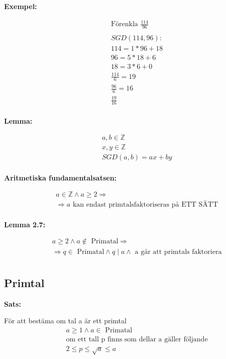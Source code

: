 \newpage
\textbf{Exempel:}\par
\begin{align*}
  &\quad \text{Förenkla } \frac{114}{96} \\
  &\quad \\
  &\quad SGD(114,96):    \\
  &\quad 114 = 1*96 + 18 \\
  &\quad 96  = 5*18 + 6  \\
  &\quad 18  = 3*6  + 0  \\
  &\quad \frac{114}{6} = 19 \\
  &\quad \frac{96}{6}  = 16 \\
  &\quad \frac{19}{16} \\
\end{align*}


\textbf{Lemma:}\par
\begin{align*}
  &\quad  a, b \in \mathbb{Z} \\
  &\quad  x, y \in \mathbb{Z} \\
  &\quad  SGD(a,b) = ax + by  \\
\end{align*}


\textbf{Aritmetiska fundamentalsatsen:}\par
\begin{align*}
  &\quad  a \in \mathbb{Z} \land a \geq 2 \Rightarrow  \\
  &\quad  \Rightarrow a \text{ kan endast primtalsfaktoriseras på ETT SÄTT} \\
\end{align*}

\textbf{Lemma 2.7:}\par
\begin{align*}
  &\quad  a \geq 2 \land a \notin \text{ Primatal} \Rightarrow \\
  &\quad  \Rightarrow q \in \text{ Primatal} \land q \mid a \land \text{ a går att primtals faktoriera}\\
\end{align*}


\newpage

\subsection{Primtal}

\textbf{Sats:}\par
För att bestäma om tal a är ett primtal
\begin{align*}
  &\quad  a \geq 1 \land a \in \text{ Primatal} \\
  &\quad  \text{om ett tall p finns som dellar a gäller följande} \\
  &\quad  2 \leq p \leq \sqrt{a} \leq a \\
\end{align*}


